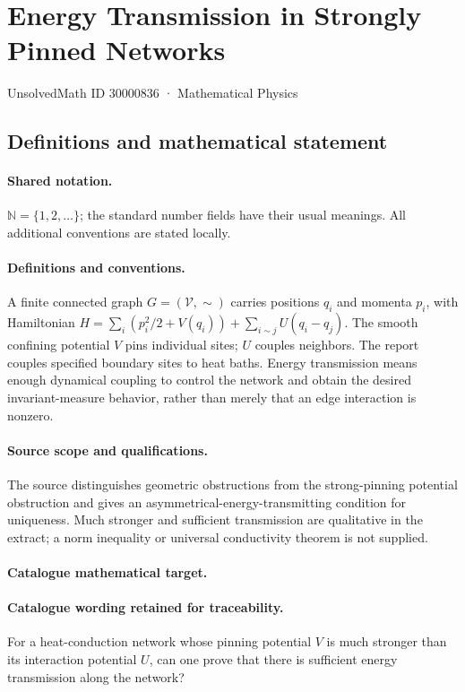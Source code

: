 \documentclass[11pt]{article}
\begin{document}
\setcounter{section}{30000835}
\section{Energy Transmission in Strongly Pinned Networks}\label{30000836}
{\small UnsolvedMath ID 30000836 · Mathematical Physics}
\subsection{Definitions and mathematical statement}

\paragraph{Shared notation.}$\mathbb N=\{1,2,\ldots\}$; the standard number fields have their usual meanings. All additional conventions are stated locally.


\paragraph{Definitions and conventions.} A finite connected graph $G=(\mathcal V,\sim)$ carries positions $q_i$ and momenta $p_i$, with Hamiltonian $H=\sum_i(p_i^2/2+V(q_i))+\sum_{i\sim j}U(q_i-q_j)$. The smooth confining potential $V$ pins individual sites; $U$ couples neighbors. The report couples specified boundary sites to heat baths. Energy transmission means enough dynamical coupling to control the network and obtain the desired invariant-measure behavior, rather than merely that an edge interaction is nonzero.

\paragraph{Source scope and qualifications.} The source distinguishes geometric obstructions from the strong-pinning potential obstruction and gives an asymmetrical-energy-transmitting condition for uniqueness. Much stronger and sufficient transmission are qualitative in the extract; a norm inequality or universal conductivity theorem is not supplied.

\paragraph{Catalogue mathematical target.}
\paragraph{Catalogue wording retained for traceability.}
For a heat-conduction network whose pinning potential $V$ is much stronger than its interaction potential $U$, can one prove that there is sufficient energy transmission along the network?
\end{document}
